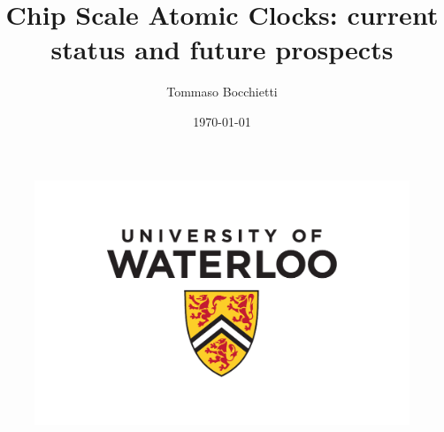 \documentclass[12pt]{assignment}
\title{Chip Scale Atomic Clocks: current status and future prospects}
\author{Tommaso Bocchietti}
\date{\today}
\begin{document}
\maketitle

\begin{figure}[H]
    \centering
    \includegraphics[width=.9\textwidth]{./pdf/UniversityOfWaterloo_logo_vert_pms}
    \label{fig:University_Of_Waterloo_logo}
\end{figure}

\clearpage


\clearpage
\tableofcontents
\listoffigures
\listoftables

\clearpage








\clearpage
\nocite{*}


\clearpage
\appendix
\label{appendix}


\end{document}
